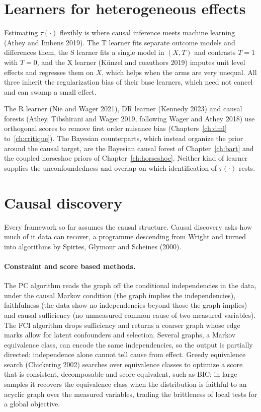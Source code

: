 \section{Learners for heterogeneous effects}\label{fw:sec:ml}

Estimating $\tau(\cdot)$ flexibly is where causal inference meets machine learning (Athey and Imbens 2019). The T learner fits separate outcome models and differences them, the S learner fits a single model in $(X,T)$ and contrasts $T=1$ with $T=0$, and the X learner (K\"unzel and coauthors 2019) imputes unit level effects and regresses them on $X$, which helps when the arms are very unequal. All three inherit the regularization bias of their base learners, which need not cancel and can swamp a small effect.

The R learner (Nie and Wager 2021), DR learner (Kennedy 2023) and causal forests (Athey, Tibshirani and Wager 2019, following Wager and Athey 2018) use orthogonal scores to remove first order nuisance bias (Chapters~\ref{ch:dml} to~\ref{ch:critique}). The Bayesian counterparts, which instead organize the prior around the causal target, are the Bayesian causal forest of Chapter~\ref{ch:bart} and the coupled horseshoe priors of Chapter~\ref{ch:horseshoe}. Neither kind of learner supplies the unconfoundedness and overlap on which identification of $\tau(\cdot)$ rests.

\section{Causal discovery}\label{fw:sec:discovery}

Every framework so far assumes the causal structure. Causal discovery asks how much of it data can recover, a programme descending from Wright and turned into algorithms by Spirtes, Glymour and Scheines (2000).

\paragraph{Constraint and score based methods.} The PC algorithm reads the graph off the conditional independencies in the data, under the causal Markov condition (the graph implies the independencies), faithfulness (the data show no independencies beyond those the graph implies) and causal sufficiency (no unmeasured common cause of two measured variables). The FCI algorithm drops sufficiency and returns a coarser graph whose edge marks allow for latent confounders and selection. Several graphs, a Markov equivalence class, can encode the same independencies, so the output is partially directed: independence alone cannot tell cause from effect. Greedy equivalence search (Chickering 2002) searches over equivalence classes to optimize a score that is consistent, decomposable and score equivalent, such as BIC; in large samples it recovers the equivalence class when the distribution is faithful to an acyclic graph over the measured variables, trading the brittleness of local tests for a global objective.

